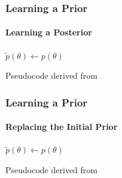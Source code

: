 \documentclass[9pt]{beamer}
\begin{document}
\begin{frame}
\frametitle{Learning a Prior}
\framesubtitle{Learning a Posterior}
\begin{algorithm}[H]
	$\tilde{p}(\theta) \leftarrow p(\theta)$\\
\end{algorithm}
\vspace{35pt}
\tiny Pseudocode derived from \cite{papamakarios2016fast}
\end{frame} 
\begin{frame}
\frametitle{Learning a Prior}
\framesubtitle{Replacing the Initial Prior}
\begin{algorithm}[H]
	$\tilde{p}(\theta) \leftarrow p(\theta)$\\
\end{algorithm}
\vspace{35pt}
\tiny Pseudocode derived from \cite{papamakarios2016fast}
\end{frame} 



\end{document}
